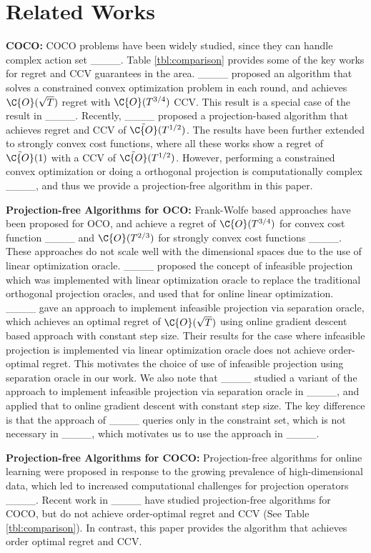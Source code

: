 \section{Related Works}
\noindent \textbf{COCO:} COCO problems have been widely studied, since they can handle complex action set ____. Table \ref{tbl:comparison} provides some of the key works for regret and CCV guarantees in the area. ____ proposed an algorithm that solves a constrained convex optimization problem in each round, and achieves $\C{O}(\sqrt{T})$ regret with $\C{O}({T}^{3/4})$ CCV. This result is a special case of the result in ____. Recently, ____ proposed a projection-based algorithm that achieves regret and CCV of $\Tilde{\C{O}}(T^{1/2})$. The results have been further extended to strongly convex cost functions, where all these works show a regret of $\Tilde{\C{O}}(1)$ with a CCV of $\Tilde{\C{O}}(T^{1/2})$. However, performing a constrained convex optimization or doing a orthogonal projection is computationally complex ____, and thus we provide a projection-free algorithm in this paper. 


\noindent \textbf{Projection-free Algorithms for OCO:} Frank-Wolfe based approaches have been proposed for OCO, and achieve a regret of $\C{O}(T^{3/4})$ for convex cost function ____ and $\C{O}(T^{2/3})$ for strongly convex cost functions ____. These approaches do not scale well with the dimensional spaces due to the use of linear optimization oracle.  ____ proposed the concept of infeasible projection which was implemented with linear optimization oracle to replace the traditional orthogonal projection oracles, and used that for online linear optimization.  ____ gave an approach to implement infeasible projection via separation oracle, which achieves an optimal regret of $\C{O}(\sqrt{T})$ using online gradient descent based approach with constant step size. Their results for the case where infeasible projection is implemented via linear optimization oracle does not achieve order-optimal regret. This motivates the choice of use of infeasible projection using separation oracle in our work. We also note that ____ studied a variant of the approach to implement infeasible projection via separation oracle in ____, and applied that to online gradient descent with constant step size. The key difference is that the approach of ____ queries only in the constraint set, which is not necessary in ____, which motivates us to use the approach in ____. 




\noindent \textbf{Projection-free Algorithms for  COCO:} 
Projection-free algorithms for online learning were proposed in response to the growing prevalence of high-dimensional data, which led to increased computational challenges for projection operators ____. Recent work in  ____ have studied  projection-free algorithms for  COCO, but do not achieve order-optimal regret and CCV (See Table \ref{tbl:comparison}). In contrast, this paper provides the algorithm that achieves order optimal regret and CCV.